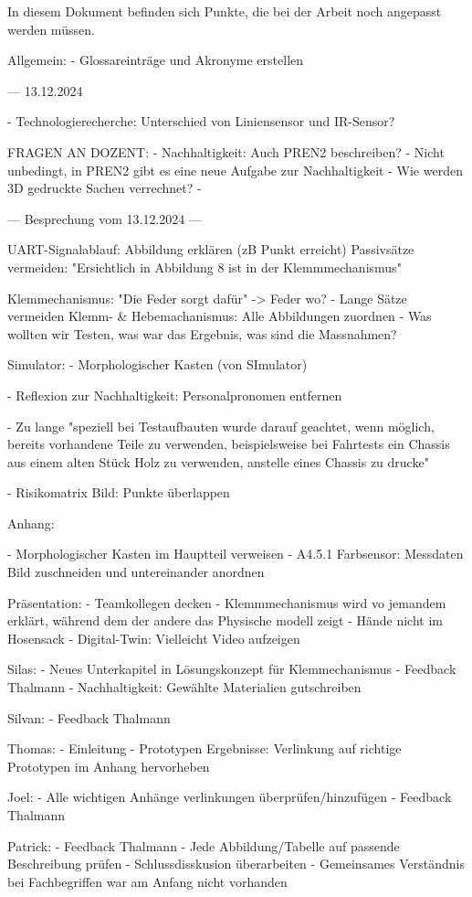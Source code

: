 
In diesem Dokument befinden sich Punkte, die bei der Arbeit noch angepasst werden müssen.

Allgemein:
- Glossareinträge und Akronyme erstellen



--- 13.12.2024

- Technologierecherche: Unterschied von Liniensensor und IR-Sensor?




FRAGEN AN DOZENT:
- Nachhaltigkeit: Auch PREN2 beschreiben?
  - Nicht unbedingt, in PREN2 gibt es eine neue Aufgabe zur Nachhaltigkeit
- Wie werden 3D gedruckte Sachen verrechnet?
  - 


--- Besprechung vom 13.12.2024 ---

UART-Signalablauf: Abbildung erklären (zB Punkt erreicht)
Passivsätze vermeiden: "Ersichtlich in Abbildung 8 ist in der Klemmmechanismus"

Klemmechanismus: "Die Feder  sorgt dafür" -> Feder wo?
- Lange Sätze vermeiden
Klemm- \& Hebemachanismus: Alle Abbildungen zuordnen
- Was wollten wir Testen, was  war das Ergebnis, was sind die Massnahmen?

Simulator:
- Morphologischer Kasten (von SImulator)



- Reflexion zur Nachhaltigkeit: Personalpronomen entfernen

- Zu lange "speziell bei Testaufbauten wurde darauf geachtet, wenn möglich, bereits
vorhandene Teile zu verwenden, beispielsweise bei Fahrtests ein Chassis aus einem alten Stück Holz zu verwenden, anstelle eines Chassis zu drucke"

- Risikomatrix Bild: Punkte überlappen

Anhang:

- Morphologischer Kasten im Hauptteil verweisen
- A4.5.1 Farbsensor: Messdaten Bild zuschneiden und untereinander anordnen


Präsentation:
- Teamkollegen decken
- Klemmmechanismus wird vo jemandem erklärt, während dem der andere das Physische modell zeigt
- Hände nicht im Hosensack
- Digital-Twin: Vielleicht Video aufzeigen



Silas:
- Neues Unterkapitel in Lösungskonzept für Klemmechanismus
- Feedback Thalmann
- Nachhaltigkeit: Gewählte Materialien gutschreiben

Silvan:
- Feedback Thalmann

Thomas:
- Einleitung
- Prototypen Ergebnisse: Verlinkung auf richtige Prototypen im Anhang hervorheben

Joel:
- Alle wichtigen Anhänge verlinkungen überprüfen/hinzufügen
- Feedback Thalmann

Patrick:
- Feedback Thalmann
- Jede Abbildung/Tabelle auf passende Beschreibung prüfen
- Schlussdisskusion überarbeiten
  - Gemeinsames Verständnis bei Fachbegriffen war am Anfang nicht vorhanden
